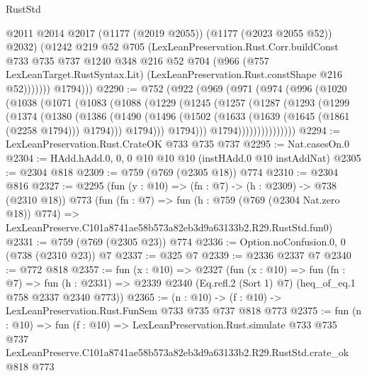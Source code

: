 \begin{lexlean}{RustStd}
\begin{coremodule}
                  @2011
                  @2014
                  @2017
                  (@1177 (@2019 @2055))
                  (@1177 (@2023 @2055 @52))
                  @2032)
                (@1242
                  @219
                  @52
                  @705
                  (LexLeanPreservation.Rust.Corr.buildConst
                    @733
                    @735
                    @737
                    @1240
                    @348
                    @216
                    @52
                    @704
                    (@966
                      (@757 LexLeanTarget.RustSyntax.Lit)
                      (LexLeanPreservation.Rust.constShape @216 @52)))))))
          @1794)))
@2290 := @752
    (@922
      (@969
        (@971
          (@974
            (@996
              (@1020
                (@1038
                  (@1071
                    (@1083
                      (@1088
                        (@1229
                          (@1245
                            (@1257
                              (@1287
                                (@1293
                                  (@1299
                                    (@1374
                                      (@1380
                                        (@1386
                                          (@1490
                                            (@1496
                                              (@1502
                                                (@1633 (@1639 (@1645 (@1861 (@2258 @1794))) @1794)))
                                              @1794)))
                                        @1794)))
                                  @1794)))))))))))))))
@2294 := LexLeanPreservation.Rust.CrateOK @733 @735 @737
@2295 := Nat.casesOn.{0}
@2304 := HAdd.hAdd.{0, 0, 0} @10 @10 @10 (instHAdd.{0} @10 instAddNat)
@2305 := @2304 @818
@2309 := @759 (@769 (@2305 @18)) @774
@2310 := @2304 @816
@2327 := @2295
    (fun (y : @10) => (fn : @7) -> (h : @2309) -> @738 (@2310 @18))
    @773
    (fun (fn : @7) =>
    fun (h : @759 (@769 (@2304 Nat.zero @18)) @774) =>
    LexLeanPreserve.C101a8741ae58b573a82eb3d9a63133b2.R29.RustStd.fun0)
@2331 := @759 (@769 (@2305 @23)) @774
@2336 := Option.noConfusion.{0, 0} (@738 (@2310 @23)) @7
@2337 := @325 @7
@2339 := @2336 @2337 @7
@2340 := @772 @818
@2357 := fun (x : @10) =>
  @2327
    (fun (x : @10) =>
    fun (fn : @7) =>
    fun (h : @2331) => @2339 @2340 (Eq.refl.{2} (Sort 1) @7) (heq_of_eq.{1} @758 @2337 @2340 @773))
@2365 := (n : @10) -> (f : @10) -> LexLeanPreservation.Rust.FunSem @733 @735 @737 @818 @773
@2375 := fun (n : @10) =>
  fun (f : @10) =>
  LexLeanPreservation.Rust.simulate
    @733
    @735
    @737
    LexLeanPreserve.C101a8741ae58b573a82eb3d9a63133b2.R29.RustStd.crate_ok
    @818
    @773
\end{coremodule}
\end{lexlean}
